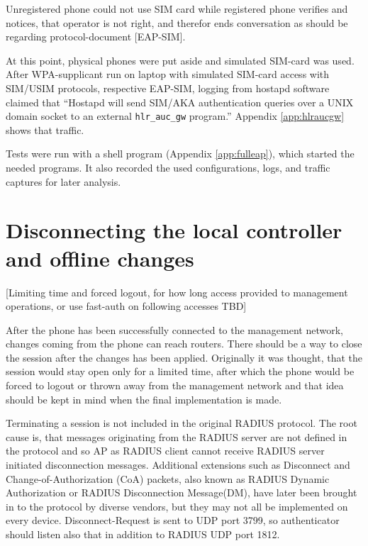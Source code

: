 \documentclass[12pt,a4paper,english]{tutthesis}
\begin{document}
Unregistered phone could not use SIM card while 
registered phone verifies and notices, that operator is not right, 
and therefor ends conversation as should be regarding protocol-document [EAP-SIM].

At this point, physical phones were put aside and simulated SIM-card
was used.
After WPA-supplicant run on laptop with simulated SIM-card access 
with SIM/USIM protocols, respective EAP-SIM, logging 
from hostapd software claimed that ``Hostapd will send SIM/AKA authentication
queries over a UNIX domain socket to an external \verb~hlr_auc_gw~ program.''
Appendix \ref{app:hlraucgw}   shows that traffic.

Tests were run with a shell program (Appendix \ref{app:fulleap}), which
started the needed programs. It also recorded the used configurations, logs,
and traffic captures for later analysis.

\section{Disconnecting the local controller and offline changes}
\label{sec-5-3}
\label{sec:disconnections}
[Limiting time and forced logout, for how long access provided to
management operations, or use fast-auth on following accesses TBD]

After the phone has been successfully connected to the management network,
changes coming from 
the phone can reach routers.  There should be a way to close the session after
the changes has been applied. Originally it was thought, that the session
would stay open only for a limited time, after which the phone would be forced to
logout or thrown away from the management network and that idea should be
kept in mind when the final implementation is made.



Terminating a session is not included in the original RADIUS protocol.
The root cause is, that messages originating from the RADIUS server
are not defined in the protocol and so AP as RADIUS client cannot
receive RADIUS server initiated disconnection messages. Additional
extensions such as Disconnect and Change-of-Authorization (CoA)
packets, also known as RADIUS Dynamic Authorization or RADIUS
Disconnection Message(DM), have later been brought in \cite{rfc5176}
to the protocol by diverse vendors, but they may not all be implemented on
every device.
Disconnect-Request is sent to UDP port 3799, so authenticator should
listen also that in addition to RADIUS UDP port 1812.
\end{document}
